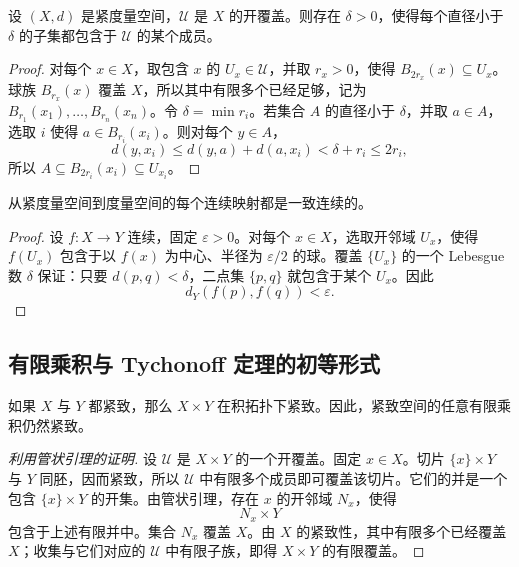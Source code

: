 \begin{theorem}
设 $(X,d)$ 是紧度量空间，$\mathcal{U}$ 是 $X$ 的开覆盖。则存在 $\delta>0$，使得每个直径小于 $\delta$ 的子集都包含于 $\mathcal{U}$ 的某个成员。
\end{theorem}

\begin{proof}
对每个 $x\in X$，取包含 $x$ 的 $U_x\in\mathcal{U}$，并取 $r_x>0$，使得 $B_{2r_x}(x)\subseteq U_x$。球族 $B_{r_x}(x)$ 覆盖 $X$，所以其中有限多个已经足够，记为 $B_{r_1}(x_1),\dots,B_{r_n}(x_n)$。令 $\delta=\min r_i$。若集合 $A$ 的直径小于 $\delta$，并取 $a\in A$，选取 $i$ 使得 $a\in B_{r_i}(x_i)$。则对每个 $y\in A$，
\[
    d(y,x_i)\leq d(y,a)+d(a,x_i)<\delta+r_i\leq 2r_i,
\]
所以 $A\subseteq B_{2r_i}(x_i)\subseteq U_{x_i}$。
\end{proof}

\begin{corollary}[紧致空间上的一致连续性]
从紧度量空间到度量空间的每个连续映射都是一致连续的。
\end{corollary}

\begin{proof}
设 $f:X\to Y$ 连续，固定 $\varepsilon>0$。对每个 $x\in X$，选取开邻域 $U_x$，使得 $f(U_x)$ 包含于以 $f(x)$ 为中心、半径为 $\varepsilon/2$ 的球。覆盖 $\{U_x\}$ 的一个 Lebesgue 数 $\delta$ 保证：只要 $d(p,q)<\delta$，二点集 $\{p,q\}$ 就包含于某个 $U_x$。因此
\[
    d_Y(f(p),f(q))<\varepsilon.
\]
\end{proof}

\subsection{有限乘积与 Tychonoff 定理的初等形式}

\begin{theorem}[有限乘积定理]
如果 $X$ 与 $Y$ 都紧致，那么 $X\times Y$ 在积拓扑下紧致。因此，紧致空间的任意有限乘积仍然紧致。
\end{theorem}

\begin{proof}[利用管状引理的证明]
设 $\mathcal{U}$ 是 $X\times Y$ 的一个开覆盖。固定 $x\in X$。切片 $\{x\}\times Y$ 与 $Y$ 同胚，因而紧致，所以 $\mathcal{U}$ 中有限多个成员即可覆盖该切片。它们的并是一个包含 $\{x\}\times Y$ 的开集。由管状引理，存在 $x$ 的开邻域 $N_x$，使得
\[
    N_x\times Y
\]
包含于上述有限并中。集合 $N_x$ 覆盖 $X$。由 $X$ 的紧致性，其中有限多个已经覆盖 $X$；收集与它们对应的 $\mathcal{U}$ 中有限子族，即得 $X\times Y$ 的有限覆盖。
\end{proof}

